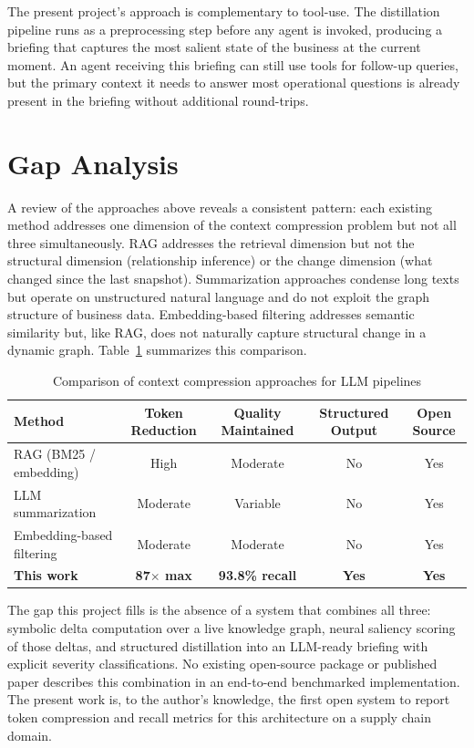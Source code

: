 The present project's approach is complementary to tool-use. The distillation pipeline
runs as a preprocessing step before any agent is invoked, producing a briefing that
captures the most salient state of the business at the current moment. An agent receiving
this briefing can still use tools for follow-up queries, but the primary context it needs
to answer most operational questions is already present in the briefing without additional
round-trips.

\section{Gap Analysis}
\label{sec:gap_analysis}

A review of the approaches above reveals a consistent pattern: each existing method
addresses one dimension of the context compression problem but not all three simultaneously.
RAG addresses the retrieval dimension but not the structural dimension (relationship inference)
or the change dimension (what changed since the last snapshot). Summarization approaches
condense long texts but operate on unstructured natural language and do not exploit the
graph structure of business data. Embedding-based filtering addresses semantic similarity
but, like RAG, does not naturally capture structural change in a dynamic graph.
Table~\ref{tab:gap_analysis} summarizes this comparison.

\begin{table}[H]
\centering
\caption{Comparison of context compression approaches for LLM pipelines}
\label{tab:gap_analysis}
\begin{tabular}{lcccc}
\toprule
\textbf{Method} & \textbf{Token Reduction} & \textbf{Quality Maintained} & \textbf{Structured Output} & \textbf{Open Source} \\
\midrule
RAG (BM25 / embedding) & High & Moderate & No & Yes \\
LLM summarization & Moderate & Variable & No & Yes \\
Embedding-based filtering & Moderate & Moderate & No & Yes \\
\textbf{This work} & \textbf{87$\times$ max} & \textbf{93.8\% recall} & \textbf{Yes} & \textbf{Yes} \\
\bottomrule
\end{tabular}
\end{table}

The gap this project fills is the absence of a system that combines all three: symbolic
delta computation over a live knowledge graph, neural saliency scoring of those deltas,
and structured distillation into an LLM-ready briefing with explicit severity
classifications. No existing open-source package or published paper describes this
combination in an end-to-end benchmarked implementation. The present work is, to the
author's knowledge, the first open system to report token compression and recall metrics
for this architecture on a supply chain domain.
